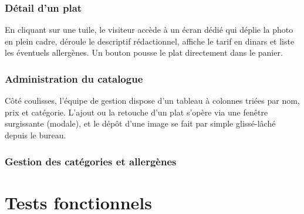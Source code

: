 \subsubsection{Détail d'un plat}


En cliquant sur une tuile, le visiteur accède à un écran dédié qui déplie la photo en plein cadre, déroule le descriptif rédactionnel, affiche le tarif en dinars et liste les éventuels allergènes. Un bouton pousse le plat directement dans le panier.

\subsubsection{Administration du catalogue}


Côté coulisses, l'équipe de gestion dispose d'un tableau à colonnes triées par nom, prix et catégorie. L'ajout ou la retouche d'un plat s'opère via une fenêtre surgissante (modale), et le dépôt d'une image se fait par simple glissé-lâché depuis le bureau.

\subsubsection{Gestion des catégories et allergènes}


\section{Tests fonctionnels}

